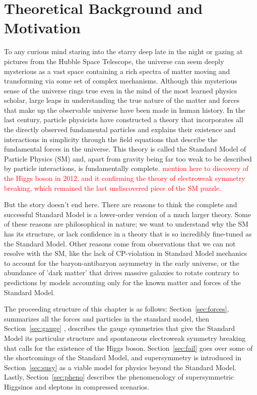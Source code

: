 \chapter{Theoretical Background and Motivation}
To any curious mind staring into the starry deep late in the night or gazing at pictures from the Hubble Space Telescope, the universe can seem deeply mysterious as a vast space containing a rich spectra of matter moving and transforming via some set of complex mechanisms.  Although this mysterious sense of the universe rings true even in the mind of the most learned physics scholar, large leaps in understanding the true nature of the matter and forces that make up the observable universe have been made in human history.   In the last century, particle physicists have constructed a theory that incorporates all the directly observed fundamental particles and explains their existence and interactions in simplicity through the field equations that describe the fundamental forces in the universe.  This theory is called the Standard Model of Particle Physics (SM) and, apart from gravity being far too weak to be described by particle interactions, is fundamentally complete.  \textcolor{red}{mention here to discovery of the Higgs boson in 2012, and it confirming the theory of electroweak symmetry breaking, which remained the last undiscovered piece of the SM puzzle.}

But the story doesn't end here.  There are reasons to think the complete and successful Standard Model is a lower-order version of a much larger theory.  Some of these reasons are philosophical in nature; we want to understand why the SM has its structure, or lack confidence in a theory that is so incredibly fine-tuned as the Standard Model.  Other reasons come from observations that we can not resolve with the SM, like the lack of CP-violation in Standard Model mechanics to account for the baryon-antibaryon asymmetry in the early universe, or the abundance of 'dark matter' that drives massive galaxies to rotate contrary to predictions by models accounting only for the known matter and forces of the Standard Model.

The proceeding structure of this chapter is as follows: Section~\ref{sec:forces}, summarizes all the forces and particles in the standard model, then Section~\ref{sec:gauge} , describes the gauge symmetries that give the Standard Model its particular structure and spontaneous electroweak symmetry breaking  that calls for the existence of the Higgs boson.  %
Section~\ref{sec:fail} goes over some of the shortcomings of the Standard Model, and supersymmetry is introduced in Section~\ref{sec:susy} as a viable model for physics beyond the Standard Model.  Lastly, Section~\ref{sec:pheno} describes the phenomenology of supersymmetric Higgsinos and sleptons in compressed scenarios.

